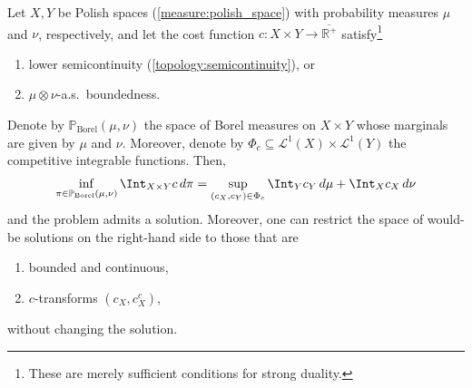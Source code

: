     \begin{theorem}
        Let $X,Y$ be Polish spaces (\cref{measure:polish_space}) with probability measures $\mu$ and $\nu$, respectively, and let the cost function $c:X\times Y\rightarrow\overline{\mathbb{R}^+}$ satisfy\footnote{These are merely sufficient conditions for strong duality.}
        \begin{enumerate}
            \item lower semicontinuity (\cref{topology:semicontinuity}), or
            \item $\mu\otimes\nu$-a.s.~boundedness.
        \end{enumerate}
        Denote by $\mathbb{P}_{\text{Borel}}(\mu,\nu)$ the space of Borel measures on $X\times Y$ whose marginals are given by $\mu$ and $\nu$. Moreover, denote by $\Phi_c\subseteq\mathcal{L}^1(X)\times\mathcal{L}^1(Y)$ the competitive integrable functions. Then,
        \begin{gather}
            \inf_{\pi\in\mathbb{P}_{\text{Borel}}(\mu,\nu)}\Int_{X\times Y}c\,d\pi = \sup_{(c_X,c_Y)\in\Phi_c}\Int_Yc_Y\,d\mu+\Int_Xc_X\,d\nu
        \end{gather}
        and the problem admits a solution. Moreover, one can restrict the space of would-be solutions on the right-hand side to those that are
        \begin{enumerate}
            \item bounded and continuous,
            \item $c$-transforms $(c_X,c_X^c)$,
        \end{enumerate}
        without changing the solution.
    \end{theorem}


